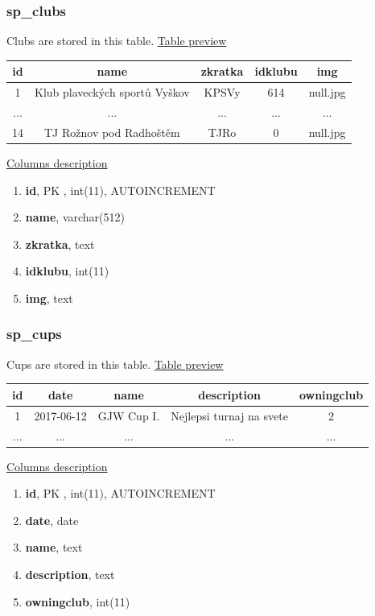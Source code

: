 \subsubsection*{sp\_clubs}
Clubs are stored in this table. 
\newline
\underline{Table preview}
\begin{center}
 \begin{tabular}{||c c c c c||} 
 \hline
 id & name & zkratka & idklubu & img \\ [0.5ex] 
 \hline\hline
 1 & Klub plaveckých sportů Vyškov & KPSVy & 614 & null.jpg \\  
 \hline
 ... & ... & ... & ... & ... \\ [0.5ex]
\hline
 14 & TJ Rožnov pod Radhoštěm & TJRo & 0 & null.jpg \\
 \hline
\end{tabular}
\end{center}
\underline{Columns description}
\begin{enumerate}
  \setlength\itemsep{0em}
  \item \textbf{id}, PK , int(11), AUTOINCREMENT
  \item \textbf{name}, varchar(512)
  \item \textbf{zkratka}, text
  \item \textbf{idklubu}, int(11)
  \item \textbf{img}, text
\end{enumerate}

\subsubsection*{sp\_cups}
Cups are stored in this table.
\newline
\underline{Table preview}
\begin{center}
 \begin{tabular}{||c c c c c||} 
 \hline
 id & date & name & description & owningclub  \\ [0.5ex] 
 \hline\hline
 1 & 2017-06-12 & GJW Cup I. & Nejlepsi turnaj na svete & 2 \\ 
 \hline
 ... & ... & ... & ... & ...  \\ [0.5ex] 
 \hline
\end{tabular}
\end{center}
\underline{Columns description}
\begin{enumerate}
  \setlength\itemsep{0em}
  \item \textbf{id}, PK , int(11), AUTOINCREMENT
  \item \textbf{date}, date
  \item \textbf{name}, text
  \item \textbf{description}, text
  \item \textbf{owningclub}, int(11)
\end{enumerate}


